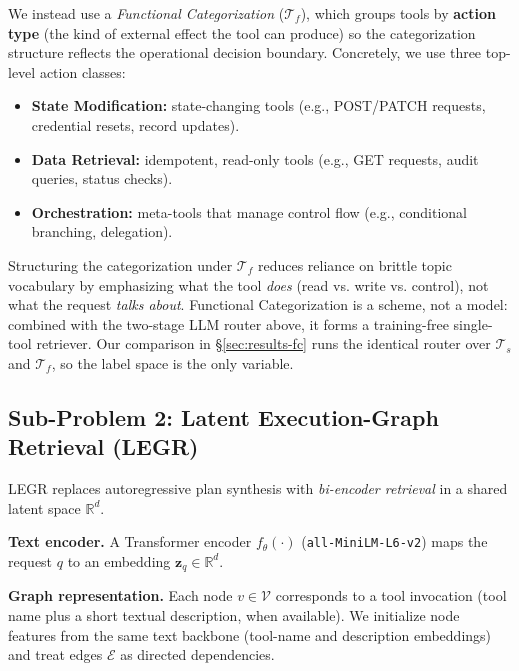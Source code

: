 \documentclass{article}
\begin{document}
We instead use a \textit{Functional Categorization} ($\mathcal{T}_f$), which groups tools by \textbf{action type} (the kind of external effect the tool can produce) so the categorization structure reflects the operational decision boundary. Concretely, we use three top-level action classes:
\begin{itemize}
    \item \textbf{State Modification:} state-changing tools (e.g., POST/PATCH requests, credential resets, record updates).
    \item \textbf{Data Retrieval:} idempotent, read-only tools (e.g., GET requests, audit queries, status checks).
    \item \textbf{Orchestration:} meta-tools that manage control flow (e.g., conditional branching, delegation).
\end{itemize}
Structuring the categorization under $\mathcal{T}_f$ reduces reliance on brittle topic vocabulary by emphasizing what the tool \emph{does} (read vs. write vs. control), not what the request \emph{talks about}. Functional Categorization is a scheme, not a model: combined with the two-stage LLM router above, it forms a training-free single-tool retriever. Our comparison in \S\ref{sec:results-fc} runs the identical router over $\mathcal{T}_s$ and $\mathcal{T}_f$, so the label space is the only variable.

\subsection{Sub-Problem 2: Latent Execution-Graph Retrieval (LEGR)}
\label{sec:legr}
LEGR replaces autoregressive plan synthesis with \emph{bi-encoder retrieval} in a shared latent space $\mathbb{R}^d$.

\textbf{Text encoder.} A Transformer encoder $f_\theta(\cdot)$ (\texttt{all-MiniLM-L6-v2}) maps the request $q$ to an embedding $\mathbf{z}_q \in \mathbb{R}^d$.

\textbf{Graph representation.} Each node $v\in\mathcal{V}$ corresponds to a tool invocation (tool name plus a short textual description, when available). We initialize node features from the same text backbone (tool-name and description embeddings) and treat edges $\mathcal{E}$ as directed dependencies.
\end{document}
